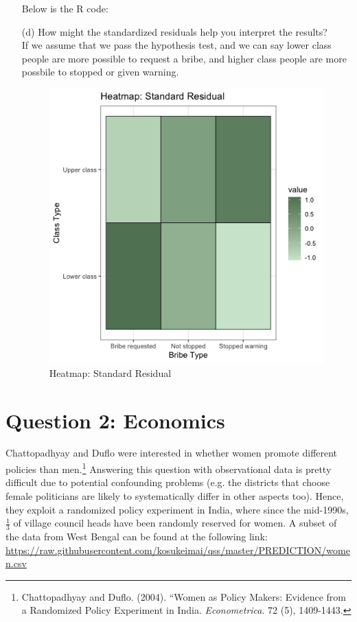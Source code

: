 \documentclass[12pt,letterpaper]{article}
\begin{document}
\begin{enumerate}
\begin{table}[h]
\begin{tabular}{l | c c c }
		\end{tabular}
	\end{table}
	Below is the R code:
	
	\newpage
	\item [(d)] How might the standardized residuals help you interpret the results?  \\
	 If we assume that we pass the hypothesis test, and we can say lower class people are more possible to request a bribe, and higher class people are more possbile to stopped or given warning. \\
	\begin{figure}[h]
		\centering
		\caption{Heatmap: Standard Residual}
		\includegraphics[scale=0.5]{Heatmap_Standard_Residual.png}
	\end{figure}
		
\end{enumerate}
\newpage

\section*{Question 2: Economics}
Chattopadhyay and Duflo were interested in whether women promote different policies than men.\footnote{Chattopadhyay and Duflo. (2004). ``Women as Policy Makers: Evidence from a Randomized Policy Experiment in India. \textit{Econometrica}. 72 (5), 1409-1443.} Answering this question with observational data is pretty difficult due to potential confounding problems (e.g. the districts that choose female politicians are likely to systematically differ in other aspects too). Hence, they exploit a randomized policy experiment in India, where since the mid-1990s, $\frac{1}{3}$ of village council heads have been randomly reserved for women. A subset of the data from West Bengal can be found at the following link: \url{https://raw.githubusercontent.com/kosukeimai/qss/master/PREDICTION/women.csv}\\
\end{document}

